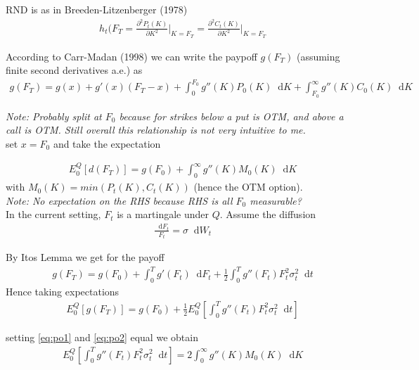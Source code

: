\documentclass{article}
\newcommand*\diff{\mathop{}\!\mathrm{d}}
\begin{document}
RND is as in Breeden-Litzenberger (1978)
\begin{align*}
    h_{t}(F_{T} = \frac{\partial^{2} P_{t}(K)}{\partial K^{2}} \big\rvert_{K = F_{T}} = \frac{\partial^{2} C_{t}(K)}{\partial K^{2}} \big\rvert_{K = F_{T}} 
\end{align*}

According to Carr-Madan (1998) we can write the paypoff $g(F_{T})$ (assuming finite second derivatives a.e.) as
\begin{align*}
g(F_{T}) = g(x) + g'(x)(F_{T} - x) + \int_{0}^{F_{0}} g''(K)P_{0}(K) \diff K + \int_{F_{0}}^{\infty} g''(K)C_{0}(K) \diff K
\end{align*}

\textit{Note: Probably split at $F_{0}$ because for strikes below a put is OTM, and above a call is OTM. Still overall this relationship is not very intuitive to me.}\\

set $x = F_{0}$ and take the expectation

\begin{align}\label{eq:po1}
    E_{0}^{Q}[d(F_{T})] = g(F_{0}) + \int_{0}^{\infty} g''(K)M_{0}(K) \diff K
\end{align}
with $M_{0}(K) = min(P_{t}(K), C_{t}(K))$ (hence the OTM option).\\

\textit{Note: No expectation on the RHS because RHS is all $F_{0}$ measurable?}\\

In the current setting, $F_{t}$ is a martingale under $Q$. Assume the diffusion
\begin{align}
    \frac{\diff F_ {t}}{F_{t}} = \sigma \diff W_{t}
\end{align}

By Itos Lemma we get for the payoff
\begin{align*}
    g(F_{T}) = g(F_{0}) + \int_{0}^{T} g'(F_{t}) \diff F_{t} + \frac{1}{2}\int_{0}^{T} g''(F_{t})F_{t}^{2} \sigma_{t}^{2} \diff t
\end{align*}
Hence taking expectations
\begin{align}\label{eq:po2}
    E_{0}^{Q}[g(F_{T})] = g(F_{0}) + \frac{1}{2} E_{0}^{Q} \left[ \int_{0}^{T} g''(F_{t}) F_{t}^{2} \sigma_{t}^{2} \diff t \right]
\end{align}

setting \ref{eq:po1} and \ref{eq:po2} equal we obtain
\begin{align}\label{eq:narela}
    E_{0}^{Q} \left[ \int_{0}^{T} g''(F_{t}) F_{t}^{2} \sigma_{t}^{2} \diff t \right] = 2 \int_{0}^{\infty} g''(K)M_{0}(K) \diff K
\end{align}
\end{document}
